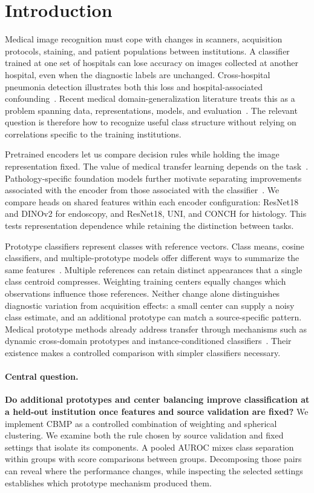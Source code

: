 \section{Introduction}
\label{sec:introduction}

Medical image recognition must cope with changes in scanners, acquisition protocols, staining, and patient populations between institutions. A classifier trained at one set of hospitals can lose accuracy on images collected at another hospital, even when the diagnostic labels are unchanged. Cross-hospital pneumonia detection illustrates both this loss and hospital-associated confounding~\cite{zech2018generalization}. Recent medical domain-generalization literature treats this as a problem spanning data, representations, models, and evaluation~\cite{yoon2024medicaldg}. The relevant question is therefore how to recognize useful class structure without relying on correlations specific to the training institutions.

Pretrained encoders let us compare decision rules while holding the image representation fixed. The value of medical transfer learning depends on the task~\cite{raghu2019transfusion}. Pathology-specific foundation models further motivate separating improvements associated with the encoder from those associated with the classifier~\cite{chen2024uni,lu2024conch}. We compare heads on shared features within each encoder configuration: ResNet18 and DINOv2 for endoscopy, and ResNet18, UNI, and CONCH for histology. This tests representation dependence while retaining the distinction between tasks.

Prototype classifiers represent classes with reference vectors. Class means, cosine classifiers, and multiple-prototype models offer different ways to summarize the same features~\cite{snell2017prototypical,chen2019closer,dhillon2001spherical}. Multiple references can retain distinct appearances that a single class centroid compresses. Weighting training centers equally changes which observations influence those references. Neither change alone distinguishes diagnostic variation from acquisition effects: a small center can supply a noisy class estimate, and an additional prototype can match a source-specific pattern. Medical prototype methods already address transfer through mechanisms such as dynamic cross-domain prototypes and instance-conditioned classifiers~\cite{en2024dpcl,guo2024infproto}. Their existence makes a controlled comparison with simpler classifiers necessary.

\paragraph{Central question.}
\textbf{Do additional prototypes and center balancing improve classification at a held-out institution once features and source validation are fixed?} We implement CBMP as a controlled combination of weighting and spherical clustering. We examine both the rule chosen by source validation and fixed settings that isolate its components. A pooled AUROC mixes class separation within groups with score comparisons between groups. Decomposing those pairs can reveal where the performance changes, while inspecting the selected settings establishes which prototype mechanism produced them.

